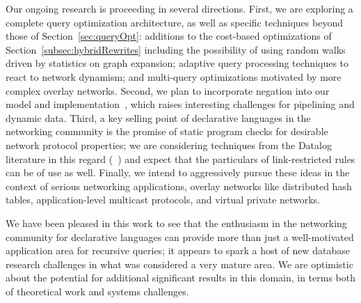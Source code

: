 Our ongoing research is proceeding in several directions. First, we are
exploring a complete query optimization architecture, as well as
specific techniques beyond those of
Section~\ref{sec:queryOpt}: additions to the cost-based
optimizations of Section~\ref{subsec:hybridRewrites}
including the possibility of using random walks driven by statistics
on graph expansion; adaptive query processing techniques to react to
network dynamism; and multi-query optimizations motivated by more
complex overlay networks. Second, we plan to incorporate
negation into our model and implementation~\cite{ullmanNegation},
which raises interesting challenges
for pipelining and dynamic data. Third, a key selling point of
declarative languages in the networking community is the promise of
static program checks for desirable network protocol properties;
we are considering techniques from the
Datalog literature in this regard (\eg ~\cite{krs}) and expect that
the particulars of link-restricted rules can be of use as well.
Finally, we intend to aggressively pursue these ideas in the context of
serious networking applications, \eg overlay networks like distributed hash
tables, application-level multicast protocols, and virtual private networks.


We have been pleased in this work to see that the enthusiasm in the
networking community for declarative languages can provide more than
just a well-motivated application area for recursive queries; it
appears to spark a host of new database research challenges in what
was considered a very mature area.  We are optimistic about the
potential for additional significant results in this domain, in terms
both of theoretical work and systems challenges.





